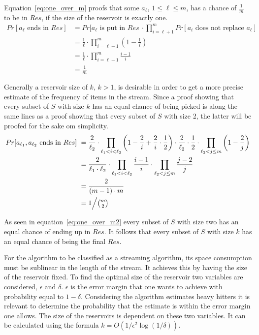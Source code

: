 Equation~\ref{eq:one_over_m} proofs that some \(a_\ell\), \(1 \le \ell \le m\), has a chance of \(\frac{1}{m}\) to be in \(Res\), if the size of the reservoir is exactly one.
\begin{equation}
	\label{eq:one_over_m}
	\begin{split}
	Pr[a_\ell \textrm{ ends in } Res]\ 
	& = Pr[a_\ell \textrm{ is put in } Res\ \cdot \prod_{i=\ell+1}^{m} Pr[a_i \textrm{ does not replace } a_\ell] \\
	& = \frac{1}{\ell} \cdot \prod_{i=\ell+1}^{m}\left(1-\frac{1}{i}\right) \\
	& = \frac{1}{\ell} \cdot \prod_{i=\ell+1}^{m}\frac{i-1}{i} \\
	& = \frac{1}{m}
	\end{split}
\end{equation}

Generally a reservoir size of \(k\), \(k > 1\), is desirable in order to get a more precise estimate of the frequency of items in the stream. Since a proof showing that every subset of \(S\) with size \(k\) has an equal chance of being picked is along the same lines as a proof showing that every subset of \(S\) with size 2, the latter will be proofed for the sake om simplicity.
\begin{equation}
	\label{eq:one_over_m2}
	\begin{split}
	Pr[a_{\ell_1}, a_{\ell_2} \textrm{ ends in } Res]\ 
	& = \frac{2}{\ell_2} \cdot \prod_{\ell_1<i<\ell_2} \left(1- \frac{2}{i} + \frac{2}{i} \cdot \frac{1}{2}\right) \cdot \frac{2}{\ell_2} \cdot \frac{1}{2} \cdot \prod_{\ell_2 < j \le m} \left( 1 - \frac{2}{j} \right)  \\
	& = \frac{2}{\ell_1 \cdot \ell_2} \cdot \prod_{\ell_1 < i < \ell_2} \frac{i-1}{i} \cdot \prod_{\ell_2 < j \le m} \frac{j-2}{j} \\
	& = \frac{2}{\left( m - 1 \right) \cdot m} \\
	& = 1\Big/\tbinom{m}{2}
	\end{split}
\end{equation}

As seen in equation~\ref{eq:one_over_m2} every subset of \(S\) with size two has an equal chance of ending up in \(Res\). It follows that every subset of \(S\) with size \(k\) has an equal chance of being the final \(Res\).

For the algorithm to be classified as a streaming algorithm, its space consumption must be sublinear in the length of the stream. It achieves this by having the size of the reservoir fixed. To find the optimal size of the reservoir two variables are considered, \(\epsilon\) and \(\delta\). \(\epsilon\) is the error margin that one wants to achieve with probability equal to \(1 - \delta\). Considering the algorithm estimates heavy hitters it is relevant to determine the probability that the estimate is within the error margin one allows. The size of the reservoirs is dependent on these two variables. It can be calculated using the formula \(k=O\left(1/\epsilon^2\log\left(1/\delta\right)\right)\). 

